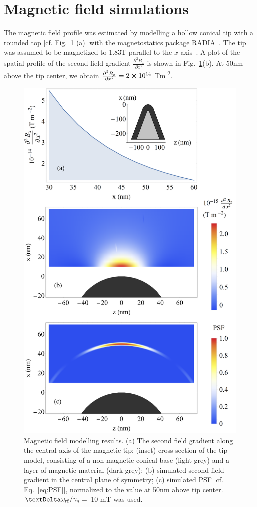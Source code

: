 \section{Magnetic field simulations} \label{app:fields}
The magnetic field profile was estimated by modelling a hollow conical tip with a rounded top [cf. Fig.~\ref{fig:fields} (a)] with the magnetostatics package RADIA~\cite{Chubar_1998}. The tip was assumed to be magnetized to 1.83\;T parallel to the $x$-axis~\cite{Grob_2019}. A plot of the spatial profile of the second field gradient $\frac{\partial^2 B_x}{\partial x ^2}$ is shown in Fig.~\ref{fig:fields}(b). At 50\;nm above the tip center, we obtain $\frac{\partial ^2 B_x}{\partial x^2} = 2\cross10^{14}$ T\;m\textsuperscript{-2}.  

\begin{figure}
	\centering
	\includegraphics[width=0.78\columnwidth]{figures/spins/fig5.png}
	\caption{Magnetic field modelling results. (a) The second field gradient along the central axis of the magnetic tip; (inset) cross-section of the tip model, consisting of a non-magnetic conical base (light grey) and a layer of magnetic material (dark grey); (b) simulated second field gradient in the central plane of symmetry; (c) simulated PSF [cf. Eq.~\eqref{eq:PSF}], normalized to the value at 50\;nm above tip center. $\Delta \omega_{\rm rf} / \gamma_n = $ 10 mT was used.}
	\label{fig:fields}
\end{figure}

